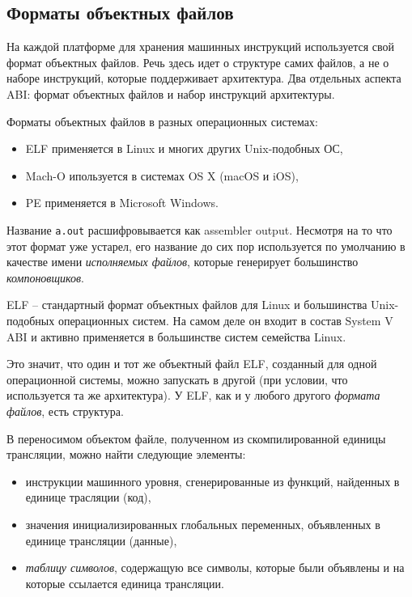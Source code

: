 \documentclass[%
	11pt,
	a4paper,
	utf8,
		]{article}
\begin{document}
\subsection{Форматы объектных файлов}

На каждой платформе для хранения машинных инструкций используется свой формат объектных файлов. Речь здесь идет о структуре самих файлов, а не о наборе инструкций, которые поддерживает архитектура. Два отдельных аспекта ABI: формат объектных файлов и набор инструкций архитектуры.

Форматы объектных файлов в разных операционных системах:
\begin{itemize}
	\item ELF применяется в Linux и многих других Unix-подобных ОС,
	
	\item Mach-O ипользуется в системах OS X (macOS и iOS),
	
	\item PE применяется в Microsoft Windows.
\end{itemize}

Название \verb|a.out| расшифровывается как assembler output. Несмотря на то что этот формат уже устарел, его название до сих пор используется по умолчанию в качестве имени \emph{исполняемых файлов}, которые генерирует большинство \emph{компоновщиков}.

ELF -- стандартный формат объектных файлов для Linux и большинства Unix-подобных операционных систем. На самом деле он входит в состав System V ABI и активно применяется в большинстве систем семейства Linux.

Это значит, что один и тот же объектный файл ELF, созданный для одной операционной системы, можно запускать в другой (при условии, что используется та же архитектура). У ELF, как и у любого другого \emph{формата файлов}, есть структура.

В переносимом объектом файле, полученном из скомпилированной единицы трансляции, можно найти следующие элементы:
\begin{itemize}
	\item инструкции машинного уровня, сгенерированные из функций, найденных в единице трасляции (код),
	
	\item значения инициализированных глобальных переменных, объявленных в единице трансляции (данные),
	
	\item \emph{таблицу символов}, содержащую все символы, которые были объявлены и на которые ссылается единица трансляции.
\end{itemize}
\end{document}
